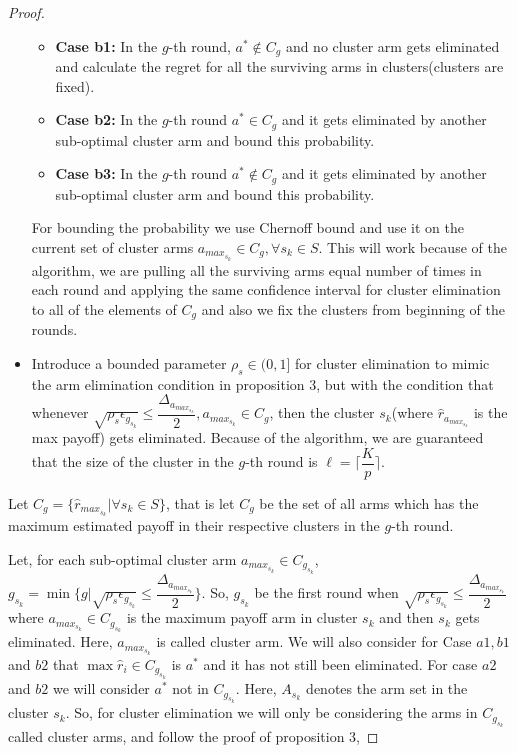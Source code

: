 \begin{proof}
\begin{itemize}
\begin{itemize}
\item \textbf{Case b1:} In the $g$-th round, $a^{*}\notin C_{g}$ and no cluster arm gets eliminated and calculate the regret for all the surviving arms in clusters(clusters are fixed).
\item \textbf{Case b2:} In the $g$-th round $a^{*}\in C_{g}$ and it gets eliminated by another sub-optimal cluster arm and bound this probability.
\item \textbf{Case b3:} In the $g$-th round $a^{*}\notin C_{g}$ and it gets eliminated by another sub-optimal cluster arm  and bound this probability.
\end{itemize}
For bounding the probability we use Chernoff bound and use it on the current set of cluster arms $a_{max_{s_{k}}}\in C_{g},\forall s_{k}\in S$. This will work because of the algorithm, we are pulling all the  surviving arms equal number of times in each round and applying the same confidence interval for cluster elimination to all of the elements of $C_{g}$ and also we fix the clusters from beginning of the rounds.
\item Introduce a bounded parameter $\rho_{s}\in (0,1]$ for cluster elimination to mimic the arm elimination condition in proposition $3$, but with the condition that whenever $\sqrt{\rho_{s}\epsilon_{g_{s_{k}}}}\leq \dfrac{\Delta_{a_{max_{s_{k}}}}}{2}, a_{max_{s_{k}}}\in C_{g}$, then the cluster $s_{k}$(where $\hat{r}_{a_{max_{s_{k}}}}$ is the max payoff) gets eliminated. Because of the algorithm, we are guaranteed that the size of the cluster in the $g$-th round is $\ell=\bigg\lceil \dfrac{K}{p}\bigg\rceil$.
\end{itemize}

Let $C_{g}=\lbrace \hat{r}_{max_{s_{k}}}| \forall s_{k}\in S \rbrace$, that is let $C_{g}$ be the set of all arms which has the maximum estimated payoff in their respective clusters in the $g$-th round.

Let, for each sub-optimal cluster arm $a_{max_{s_{k}}}\in C_{g_{s_{k}}}$, $g_{s_{k}}=\min{\lbrace g|\sqrt{\rho_{s}\epsilon_{g_{s_{k}}}}\leq \dfrac{\Delta_{a_{max_{s_{k}}}}}{2} \rbrace}$. So, $g_{s_{k}}$ be the first round when $\sqrt{\rho_{s}\epsilon_{g_{s_{k}}}}\leq \dfrac{\Delta_{a_{max_{s_{k}}}}}{2}$ where $a_{max_{s_{k}}}\in C_{g_{s_{k}}}$ is the maximum payoff arm in cluster $s_{k}$ and then $s_{k}$ gets eliminated. Here, $a_{max_{s_{k}}}$ is called cluster arm. We will also consider for Case $a1,b1 $ and $b2$  that $\max \hat{r}_{i}\in C_{g_{s_{k}}}$ is $a^{*}$ and it has not still been eliminated. For case $a2$ and $b2$ we will consider $a^{*}$ not in $C_{g_{s_{k}}}$. Here, $A_{{s_{k}}}$ denotes the arm set in the cluster $s_{k}$. So, for cluster elimination we will only be considering the arms in $C_{g_{s_{k}}}$ called cluster arms, and follow the proof of proposition $3$,


\end{proof}
